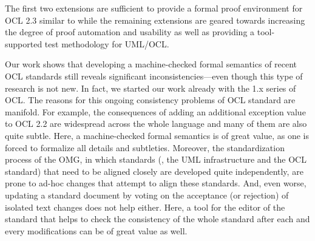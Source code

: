 The first two extensions are sufficient to provide a formal proof
environment for OCL 2.3 similar to \holocl while the remaining
extensions are geared towards increasing the degree of proof
automation and usability as well as providing a tool-supported test
methodology for {UML}/{OCL}.


Our work shows that developing a machine-checked formal semantics of
recent {OCL} standards still reveals significant
inconsistencies---even though this type of research is not new. In
fact, we started our work already with the 1.x series of
{OCL}. The reasons for this ongoing consistency problems of
{OCL} standard are manifold. For example, the consequences of
adding an additional exception value to OCL 2.2 are widespread across
the whole language and many of them are also quite subtle. Here, a
machine-checked formal semantics is of great value, as one is forced
to formalize all details and subtleties.  Moreover, the
standardization process of the {OMG}, in which standards (\eg, the
{UML} infrastructure and the {OCL} standard) that need to be
aligned closely are developed quite independently, are prone to ad-hoc
changes that attempt to align these standards. And, even worse,
updating a standard document by voting on the acceptance (or
rejection) of isolated text changes does not help either. Here, a tool
for the editor of the standard that helps to check the consistency of
the whole standard after each and every modifications can be of great
value as well.


